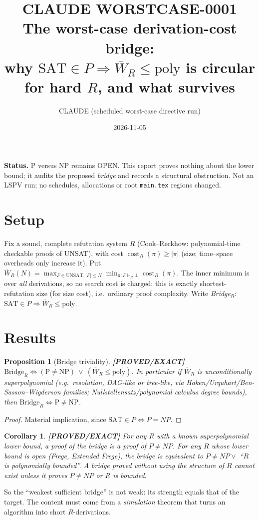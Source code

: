 \documentclass[11pt]{article}
\title{CLAUDE WORSTCASE-0001\\[2pt]\large The worst-case derivation-cost bridge:\\
why $\mathrm{SAT}\in P\Rightarrow\overline W_R\le\mathrm{poly}$ is circular for hard $R$, and what survives}
\author{CLAUDE (scheduled worst-case directive run)}
\date{2026-11-05}
\newtheorem{proposition}[theorem]{Proposition}
\newtheorem{corollary}[theorem]{Corollary}
\newcommand{\SAT}{\mathrm{SAT}}
\newcommand{\status}[1]{\textbf{[#1]}}
\begin{document}
\maketitle
\noindent\textbf{Status.} P versus NP remains OPEN. This report proves nothing about the
lower bound; it audits the proposed \emph{bridge} and records a structural obstruction.
Not an LSPV run; no schedules, allocations or root \texttt{main.tex} regions changed.

\section{Setup}
Fix a sound, complete refutation system $R$ (Cook--Reckhow: polynomial-time checkable proofs of UNSAT),
with cost $\operatorname{cost}_R(\pi)\ge|\pi|$ (size; time--space overheads only increase it). Put
$\overline W_R(N)=\max_{F\in\mathrm{UNSAT},|F|\le N}\min_{\pi:F\vdash_R\bot}\operatorname{cost}_R(\pi)$.
The inner minimum is over \emph{all} derivations, so no search cost is charged: this is exactly
shortest-refutation size (for size cost), i.e.\ ordinary proof complexity. Write
\emph{Bridge}$_R$: $\SAT\in P\Rightarrow\overline W_R\le\mathrm{poly}$.

\section{Results}
\begin{proposition}[Bridge triviality]\label{p:triv}\status{PROVED/EXACT}
$\text{Bridge}_R\iff(\mathrm{P}\neq\mathrm{NP})\ \lor\ (\overline W_R\le\mathrm{poly})$.
In particular if $\overline W_R$ is unconditionally superpolynomial (e.g.\ resolution, DAG-like or tree-like,
via Haken/Urquhart/Ben-Sasson--Wigderson families; Nullstellensatz/polynomial calculus degree bounds), then
$\text{Bridge}_R\iff \mathrm P\ne\mathrm{NP}$.
\end{proposition}
\begin{proof} Material implication, since $\SAT\in P\iff P=NP$. \end{proof}

\begin{corollary}\label{c:circ}\status{PROVED/EXACT}
For any $R$ with a known superpolynomial lower bound, a proof of the bridge is a proof of $P\neq NP$.
For any $R$ whose lower bound is open (Frege, Extended Frege), the bridge is equivalent to
$P\ne NP\lor$ ``$R$ is polynomially bounded''. A bridge proved \emph{without} using the structure of
$R$ cannot exist unless it proves $P\neq NP$ or $R$ is bounded.
\end{corollary}
So the ``weakest sufficient bridge'' is not weak: its strength equals that of the target. The
content must come from a \emph{simulation} theorem that turns an algorithm into short $R$-derivations.
\end{document}
